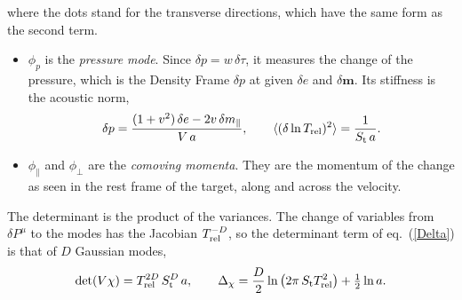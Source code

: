 \documentclass[11pt,aps,preprint,nofootinbib,superscriptaddress,tightenlines]{revtex4-2}
\newcommand{\avg}[1]{\langle #1\rangle}
\def\st{\begin{equation}}
\def\stp{\end{equation}}
\def\Eq#1{eq.~(\ref{#1})}
\begin{document}
where the dots stand for the transverse directions, which have the same form as the second term.
\begin{itemize}
\item $\phi_p$ is the \emph{pressure mode}.  Since $\delta p=w\,\delta\tau$, it measures the change of the pressure, which is the Density Frame
  $\delta p$ at given $\delta e$ and $\delta\bm m$.  Its stiffness is the acoustic norm,
  \st
  \delta p=\frac{(1+v^2)\,\delta e-2v\,\delta m_\parallel}{V\,a},\qquad \avg{(\delta\ln T_{\rm rel})^2}=\frac1{S_{\rm t}\,a} .
  \stp
\item $\phi_\parallel$ and $\phi_\perp$ are the \emph{comoving momenta}.  They are the momentum of the change as seen in the rest frame of the target, along and
  across the velocity.
\end{itemize}
The determinant is the product of the variances.  The change of variables from $\delta P^\mu$ to the modes has the Jacobian $T_{\rm rel}^{-D}$, so the determinant term of \Eq{Delta} is that of $D$ Gaussian modes,
\st
\det(V\chi)=T_{\rm rel}^{2D}\,S_{\rm t}^{D}\,a,\qquad
\Delta_\chi=\frac D2\ln\big(2\pi\,S_{\rm t}T_{\rm rel}^2\big)+\tfrac12\ln a .
\stp
\end{document}
